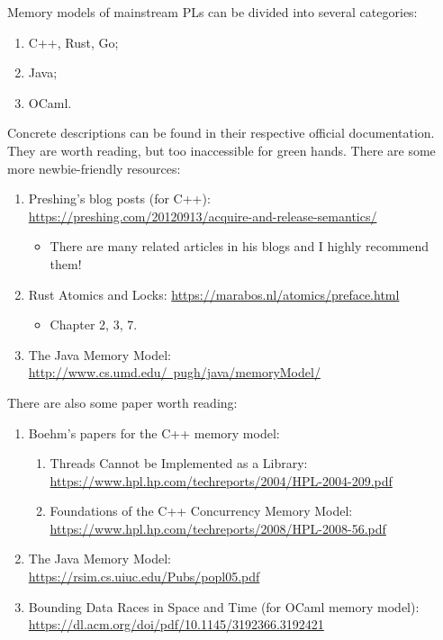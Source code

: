 \documentclass{article}
\begin{document}
Memory models of mainstream PLs can be divided into several categories:
\begin{enumerate}
    \item C++, Rust, Go;
    \item Java;
    \item OCaml.
\end{enumerate}
Concrete descriptions can be found in their respective official documentation.
They are worth reading, but too inaccessible for green hands.
There are some more newbie-friendly resources:
\begin{enumerate}
    \item Preshing's blog posts (for C++):\\
    \href{https://preshing.com/20120913/acquire-and-release-semantics/}{https://preshing.com/20120913/acquire-and-release-semantics/}
    \begin{itemize}
        \item There are many related articles in his blogs and I highly recommend them!
    \end{itemize}
    \item Rust Atomics and Locks:
    \href{https://marabos.nl/atomics/preface.html}{https://marabos.nl/atomics/preface.html}
    \begin{itemize}
        \item Chapter 2, 3, 7.
    \end{itemize}
    \item The Java Memory Model:\\
    \href{http://www.cs.umd.edu/~pugh/java/memoryModel/}{http://www.cs.umd.edu/~pugh/java/memoryModel/}
\end{enumerate}

There are also some paper worth reading:
\begin{enumerate}
    \item Boehm's papers for the C++ memory model:
    \begin{enumerate}
        \item Threads Cannot be Implemented as a Library:\\
        \href{https://www.hpl.hp.com/techreports/2004/HPL-2004-209.pdf}{https://www.hpl.hp.com/techreports/2004/HPL-2004-209.pdf}
        \item  Foundations of the C++ Concurrency Memory Model:\\
        \href{https://www.hpl.hp.com/techreports/2008/HPL-2008-56.pdf}{https://www.hpl.hp.com/techreports/2008/HPL-2008-56.pdf}
    \end{enumerate}
    \item The Java Memory Model:\\
    \href{https://rsim.cs.uiuc.edu/Pubs/popl05.pdf}{https://rsim.cs.uiuc.edu/Pubs/popl05.pdf}
    \item Bounding Data Races in Space and Time (for OCaml memory model):\\
    \href{https://dl.acm.org/doi/pdf/10.1145/3192366.3192421}{https://dl.acm.org/doi/pdf/10.1145/3192366.3192421}
\end{enumerate}
\end{document}

